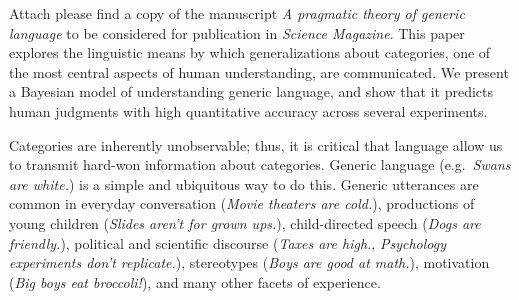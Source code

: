 \documentclass[11pt,stdletter,dateno,sigleft]{newlfm} %
\begin{document}
\begin{newlfm}


%
%
%

Attach please find a copy of the manuscript \emph{A pragmatic theory of generic language} to be considered for publication in \emph{Science Magazine}. 
This paper explores the linguistic means by which generalizations about categories, one of the most central aspects of human understanding, are communicated.  
We present a Bayesian model of understanding generic language, and show that it predicts human judgments with high quantitative accuracy across several experiments.


Categories are inherently unobservable; thus, it is critical that language allow us to transmit hard-won information about categories. Generic language (e.g.~\emph{Swans are white.}) is a simple and ubiquitous way to do this. 
Generic utterances are common in everyday conversation (\emph{Movie theaters are cold.}), productions of young children (\emph{Slides aren't for grown ups.}), child-directed speech (\emph{Dogs are friendly.}), political and scientific discourse (\emph{Taxes are high.}, \emph{Psychology experiments don't replicate.}), stereotypes (\emph{Boys are good at math.}), motivation (\emph{Big boys eat broccoli!}), and many other facets of experience.


\end{newlfm}
\end{document}
